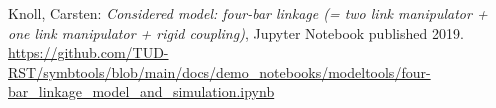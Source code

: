 \documentclass[10pt,a4paper]{article}
\begin{document}

	\begin{thebibliography}{10}
		Knoll, Carsten:
		\textit{Considered model: four-bar linkage (= two link manipulator + one link manipulator + rigid coupling)}, Jupyter Notebook published 2019. \\
		\url{https://github.com/TUD-RST/symbtools/blob/main/docs/demo_notebooks/modeltools/four-bar_linkage_model_and_simulation.ipynb}
	\end{thebibliography}
\end{document}
